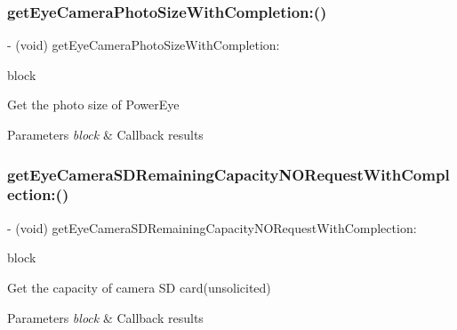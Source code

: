 \subsubsection{\texorpdfstring{get\+Eye\+Camera\+Photo\+Size\+With\+Completion\+:()}{getEyeCameraPhotoSizeWithCompletion:()}}
{\footnotesize\ttfamily -\/ (void) get\+Eye\+Camera\+Photo\+Size\+With\+Completion\+: \begin{DoxyParamCaption}\item[{(void($^\wedge$)(P\+V\+Eye\+Camera\+Photo\+Size photo\+Size, N\+S\+Error $\ast$\+\_\+\+Nullable error))}]{block }\end{DoxyParamCaption}}

Get the photo size of Power\+Eye


\begin{DoxyParams}{Parameters}
{\em block} & Callback results \\
\hline
\end{DoxyParams}
\mbox{\label{interface_p_v_eye_camera_a303f6825fa1f885bca11298989637eaf}} 
\subsubsection{\texorpdfstring{get\+Eye\+Camera\+S\+D\+Remaining\+Capacity\+N\+O\+Request\+With\+Complection\+:()}{getEyeCameraSDRemainingCapacityNORequestWithComplection:()}}
{\footnotesize\ttfamily -\/ (void) get\+Eye\+Camera\+S\+D\+Remaining\+Capacity\+N\+O\+Request\+With\+Complection\+: \begin{DoxyParamCaption}\item[{(void($^\wedge$)(N\+S\+Integer remaining\+Capacity, N\+S\+Error $\ast$\+\_\+\+Nullable error))}]{block }\end{DoxyParamCaption}}

Get the capacity of camera SD card(unsolicited)


\begin{DoxyParams}{Parameters}
{\em block} & Callback results \\
\hline
\end{DoxyParams}
\mbox{\label{interface_p_v_eye_camera_a9cac9e6fab67c4da6ad1f42571ab7002}} 
